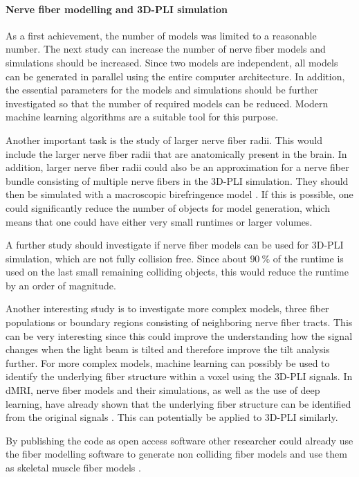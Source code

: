 \paragraph{Nerve fiber modelling and \ac{3D-PLI} simulation}
% 
As a first achievement, the number of models was limited to a reasonable number.
The next study can increase the number of nerve fiber models and simulations should be increased.
Since two models are independent, all models can be generated in parallel using the entire computer architecture.
In addition, the essential parameters for the models and simulations should be further investigated so that the number of required models can be reduced.
Modern machine learning algorithms are a suitable tool for this purpose.
\par
% 
Another important task is the study of larger nerve fiber radii.
This would include the larger nerve fiber radii that are anatomically present in the brain.
In addition, larger nerve fiber radii could also be an approximation for a nerve fiber bundle consisting of multiple nerve fibers in the \ac{3D-PLI} simulation.
They should then be simulated with a macroscopic birefringence model \cite{Menzel2015}.
If this is possible, one could significantly reduce the number of objects for model generation, which means that one could have either very small runtimes or larger volumes.
\par
% 
A further study should investigate if nerve fiber models can be used for \ac{3D-PLI} simulation, which are not fully collision free.
Since about $\SI{90}{\percent}$ of the runtime is used on the last small remaining colliding objects, this would reduce the runtime by an order of magnitude.
\par
% 
Another interesting study is to investigate more complex models, \eg{} three fiber populations or boundary regions consisting of neighboring nerve fiber tracts.
This can be very interesting since this could improve the understanding how the signal changes when the light beam is tilted and therefore improve the tilt analysis further.
For more complex models, machine learning can possibly be used to identify the underlying fiber structure within a voxel using the \ac{3D-PLI} signals. 
In \ac{dMRI}, nerve fiber models and their simulations, as well as the use of deep learning, have already shown that the underlying fiber structure can be identified from the original signals \cite{ginsburgerDis2019}.
This can potentially be applied to \ac{3D-PLI} similarly.
\par
% 
By publishing the code as open access software other researcher could already use the fiber modelling software to generate non colliding fiber models and use them as skeletal muscle fiber models \cite{Ji2021}.